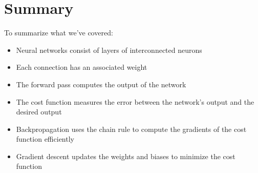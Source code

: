 \section{Summary}
To summarize what we've covered:
\begin{itemize}
    \item Neural networks consist of layers of interconnected neurons
    \item Each connection has an associated weight
    \item The forward pass computes the output of the network
    \item The cost function measures the error between the network’s output and the desired output
    \item Backpropagation uses the chain rule to compute the gradients of the cost function efficiently
    \item Gradient descent updates the weights and biases to minimize the cost function
\end{itemize}
